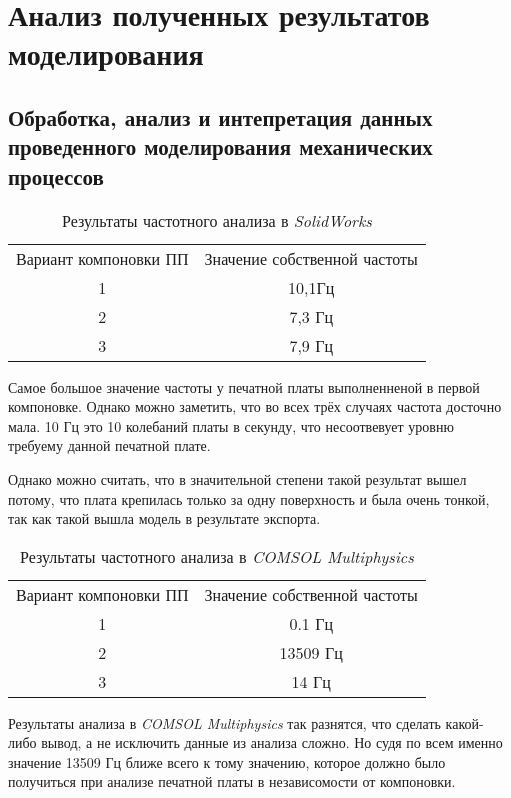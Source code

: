 \newpage
\section{Анализ полученных результатов моделирования}
\subsection{Обработка, анализ и интепретация данных проведенного моделирования механических процессов}

\begin{table}[h]
  \centering
  \caption{Результаты частотного анализа в \textit{SolidWorks}}
\begin{tabular}{|c|c|}
\hline
  Вариант компоновки ПП & Значение собственной частоты \\
  1 & 10,1Гц \\
  2 & 7,3 Гц \\
  3 & 7,9 Гц \\
\hline
\end{tabular}
\end{table}

Самое большое значение частоты у печатной платы выполненненой в первой компоновке. Однако можно заметить, что во всех трёх случаях частота досточно мала. 10 Гц это 10 колебаний платы в секунду, что несоотвевует уровню требуему данной печатной плате.

Однако можно считать, что в значительной степени такой результат вышел потому, что плата крепилась только за одну поверхность и была очень тонкой, так как такой вышла модель в результате экспорта.

\begin{table}[h]
  \centering
  \caption{Результаты частотного анализа в \textit{COMSOL Multiphysics}}
\begin{tabular}{|c|c|}
\hline
  Вариант компоновки ПП & Значение собственной частоты \\
  1 & 0.1 Гц \\
  2 & 13509 Гц \\
  3 & 14 Гц \\
\hline
\end{tabular}
\end{table}

Результаты анализа в \textit{COMSOL Multiphysics} так разнятся, что сделать какой-либо вывод, а не исключить данные из анализа сложно.
Но судя по всем именно значение 13509 Гц ближе всего к тому значению, которое должно было получиться при анализе печатной платы в независомости от компоновки.
